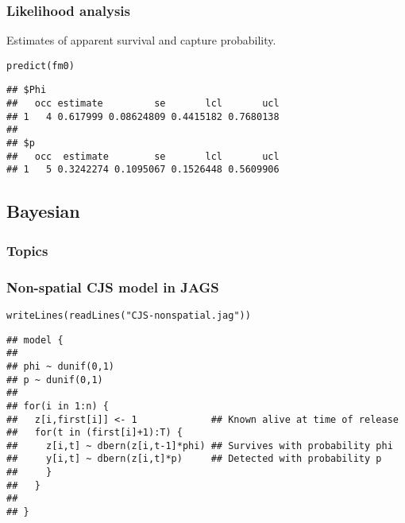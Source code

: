 \documentclass[color=usenames,dvipsnames]{beamer}\usepackage[]{graphicx}\usepackage[]{color}
\makeatletter
\newcommand{\hlstr}[1]{\textcolor[rgb]{0.749,0.012,0.012}{#1}}%
\newcommand{\hlstd}[1]{\textcolor[rgb]{0,0,0}{#1}}%
\newcommand{\hlkwd}[1]{\textcolor[rgb]{0.004,0.004,0.506}{#1}}%
\newenvironment{kframe}{%
 \def\at@end@of@kframe{}%
 \ifinner\ifhmode%
  \def\at@end@of@kframe{\end{minipage}}%
  \begin{minipage}{\columnwidth}%
 \fi\fi%
 \def\FrameCommand##1{\hskip\@totalleftmargin \hskip-\fboxsep
 \colorbox{shadecolor}{##1}\hskip-\fboxsep
     \hskip-\linewidth \hskip-\@totalleftmargin \hskip\columnwidth}%
 \MakeFramed {\advance\hsize-\width
   \@totalleftmargin\z@ \linewidth\hsize
   \@setminipage}}%
 {\par\unskip\endMakeFramed%
 \at@end@of@kframe}
\newenvironment{knitrout}{}{} %
\makeatother
\begin{document}
\begin{frame}[fragile]
  \frametitle{Likelihood analysis}
  Estimates of apparent survival and capture probability.
\begin{knitrout}\footnotesize
{}\color{fgcolor}\begin{kframe}
\begin{alltt}
\hlkwd{predict}\hlstd{(fm0)}
\end{alltt}
\begin{verbatim}
## $Phi
##   occ estimate         se       lcl       ucl
## 1   4 0.617999 0.08624809 0.4415182 0.7680138
## 
## $p
##   occ  estimate        se       lcl       ucl
## 1   5 0.3242274 0.1095067 0.1526448 0.5609906
\end{verbatim}
\end{kframe}
\end{knitrout}
\end{frame}




\subsection{Bayesian}



\begin{frame}[plain]
  \frametitle{Topics}
  \Large
\end{frame}


\begin{frame}[fragile]
  \frametitle{Non-spatial CJS model in JAGS}
\begin{knitrout}\scriptsize
{}\color{fgcolor}\begin{kframe}
\begin{alltt}
\hlkwd{writeLines}\hlstd{(}\hlkwd{readLines}\hlstd{(}\hlstr{"CJS-nonspatial.jag"}\hlstd{))}
\end{alltt}
\begin{verbatim}
## model {
## 
## phi ~ dunif(0,1)
## p ~ dunif(0,1)
## 
## for(i in 1:n) {
##   z[i,first[i]] <- 1             ## Known alive at time of release
##   for(t in (first[i]+1):T) {
##     z[i,t] ~ dbern(z[i,t-1]*phi) ## Survives with probability phi
##     y[i,t] ~ dbern(z[i,t]*p)     ## Detected with probability p
##     }
##   }
## 
## }
\end{verbatim}
\end{kframe}
\end{knitrout}
\end{frame}
\end{document}
